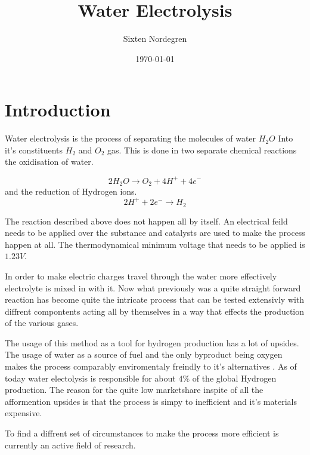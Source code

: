 \documentclass[twocolumn]{revtex4-2}
\begin{document}
\title{Water Electrolysis}
\author{Sixten Nordegren}

\date{\today}

\maketitle
\section{Introduction}
Water electrolysis is the process of separating the molecules of water $H_2O$ Into it's 
constituents $H_2$ and $O_2$ gas. This is done in two separate chemical reactions the
oxidisation of water.

\begin{equation}
	2H_2O \rightarrow O_2 + 4 H^+ +4e^- 
	\label{eq: oxidisation}
\end{equation}
and the reduction of Hydrogen ions.
\begin{equation}
	2 H^+ + 2e^- \rightarrow H_2
	\label{eq: reduction}
\end{equation}

The reaction described above does not happen all by itself. An electrical feild needs to be
applied over the substance and catalysts are used to make the process happen at all. The 
thermodynamical minimum voltage that needs to be applied is $1.23 V$. 

In order to make electric charges travel through the water more effectively electrolyte is 
mixed in with it. Now what previously was a quite straight forward reaction has become quite
the intricate process that can be tested extensivly with diffrent compontents acting all by
themselves in a way that effects the production of the various gases.

\par

The usage of this method as a tool for hydrogen production has a lot of upsides. The usage
of water as a source of fuel and the only byproduct being oxygen makes the process comparably
enviromentaly freindly to it's alternatives \cite{DOSSANTOS2017563}. As of today water electolysis is responsible for about $4\%$ of the global Hydrogen
production. The reason for the quite low marketshare inspite of all the afformention upsides 
is that the process is simpy to inefficient and it's materials expensive\cite{SHIVAKUMAR2019442}.

To find a diffrent set of circumstances to make the process more efficient is currently an
active field of research. 
\end{document}

